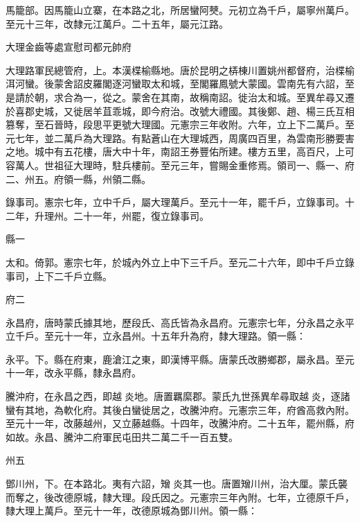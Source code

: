 \begin{pinyinscope}
 馬籠部。因馬籠山立寨，在本路之北，所居蠻阿僰。元初立為千戶，屬寧州萬戶。至元十三年，改隸元江萬戶。二十五年，屬元江路。



 大理金齒等處宣慰司都元帥府



 大理路軍民總管府，上。本漢楪榆縣地。唐於昆明之梇棟川置姚州都督府，治楪榆洱河蠻。後蒙舍詔皮羅閣逐河蠻取太和城，至閣羅鳳號大蒙國。雲南先有六詔，至是請於朝，求合為一，從之。蒙舍在其南，故稱南詔。徙治太和城。至異牟尋又遷於喜郡史城，又徙居羊苴乖城，即今府治。改號大禮國。其後鄭、趙、楊三氏互相篡奪，至石晉時，段思平更號大理國。元憲宗三年收附。六年，立上下二萬戶。至元七年，並二萬戶為大理路。有點蒼山在大理城西，周廣四百里，為雲南形勝要害之地。城中有五花樓，唐大中十年，南詔王券豐佑所建。樓方五里，高百尺，上可容萬人。世祖征大理時，駐兵樓前。至元三年，嘗賜金重修焉。領司一、縣一、府二、州五。府領一縣，州領二縣。



 錄事司。憲宗七年，立中千戶，屬大理萬戶。至元十一年，罷千戶，立錄事司。十二年，升理州。二十一年，州罷，復立錄事司。



 縣一



 太和。倚郭。憲宗七年，於城內外立上中下三千戶。至元二十六年，即中千戶立錄事司，上下二千戶立縣。



 府二



 永昌府，唐時蒙氏據其地，歷段氏、高氏皆為永昌府。元憲宗七年，分永昌之永平立千戶。至元十一年，立永昌州。十五年升為府，隸大理路。領一縣：



 永平。下。縣在府東，鹿滄江之東，即漢博平縣。唐蒙氏改勝鄉郡，屬永昌。至元十一年，改永平縣，隸永昌府。



 騰沖府，在永昌之西，即越炎地。唐置羈縻郡。蒙氏九世孫異牟尋取越炎，逐諸蠻有其地，為軟化府。其後白蠻徙居之，改騰沖府。元憲宗三年，府酋高救內附。至元十一年，改藤越州，又立藤越縣。十四年，改騰沖府。二十五年，罷州縣，府如故。永昌、騰沖二府軍民屯田共二萬二千一百五雙。



 州五



 鄧川州，下。在本路北。夷有六詔，矰炎其一也。唐置矰川州，治大厘。蒙氏襲而奪之，後改德原城，隸大理。段氏因之。元憲宗三年內附。七年，立德原千戶，隸大理上萬戶。至元十一年，改德原城為鄧川州。領一縣：




\end{pinyinscope}

